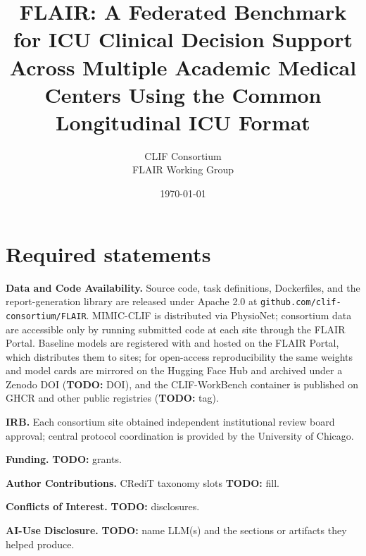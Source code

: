 \documentclass[11pt]{article}
\title{\textbf{FLAIR: A Federated Benchmark for ICU Clinical Decision
Support Across Multiple Academic Medical Centers Using the Common Longitudinal
ICU Format}}
\author{CLIF Consortium \\ FLAIR Working Group}
\date{\today}
\newcommand{\todo}[1]{{\color{red}\textbf{TODO:} #1}}
\begin{document}
\maketitle















\section*{Required statements}
\noindent\textbf{Data and Code Availability.} Source code, task
definitions, Dockerfiles, and the report-generation library are
released under Apache 2.0 at \texttt{github.com/clif-consortium/FLAIR}.
MIMIC-CLIF is distributed via PhysioNet; consortium data are accessible
only by running submitted code at each site through the FLAIR Portal.
Baseline models are registered with and hosted on the FLAIR Portal,
which distributes them to sites; for open-access reproducibility the
same weights and model cards are mirrored on the Hugging Face Hub and
archived under a Zenodo DOI (\todo{DOI}), and the CLIF-WorkBench
container is published on GHCR and other public registries
(\todo{tag}).

\noindent\textbf{IRB.} Each consortium site obtained independent
institutional review board approval; central protocol coordination is
provided by the University of Chicago.

\noindent\textbf{Funding.} \todo{grants}.

\noindent\textbf{Author Contributions.} CRediT taxonomy slots \todo{fill}.

\noindent\textbf{Conflicts of Interest.} \todo{disclosures}.

\noindent\textbf{AI-Use Disclosure.} \todo{name LLM(s) and the sections
or artifacts they helped produce}.




\appendix

\end{document}

